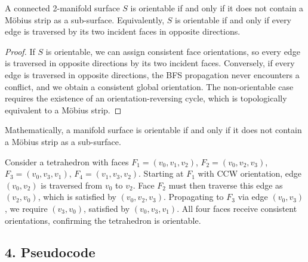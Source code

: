 \begin{theorem}\label{thm:orientability}
A connected 2-manifold surface $S$ is orientable if and only if it does not contain a M\"obius strip as a sub-surface. Equivalently, $S$ is orientable if and only if every edge is traversed by its two incident faces in opposite directions.
\end{theorem}

\begin{proof}
If $S$ is orientable, we can assign consistent face orientations, so every edge is traversed in opposite directions by its two incident faces. Conversely, if every edge is traversed in opposite directions, the BFS propagation never encounters a conflict, and we obtain a consistent global orientation. The non-orientable case requires the existence of an orientation-reversing cycle, which is topologically equivalent to a M\"obius strip.
\end{proof}

Mathematically, a manifold surface is orientable if and only if it does not contain a M\"obius strip as a sub-surface.

\begin{example}\label{ex:orient_mesh}
Consider a tetrahedron with faces $F_1 = (v_0,v_1,v_2)$, $F_2 = (v_0,v_2,v_3)$, $F_3 = (v_0,v_3,v_1)$, $F_4 = (v_1,v_3,v_2)$. Starting at $F_1$ with CCW orientation, edge $(v_0,v_2)$ is traversed from $v_0$ to $v_2$. Face $F_2$ must then traverse this edge as $(v_2,v_0)$, which is satisfied by $(v_0,v_2,v_3)$. Propagating to $F_3$ via edge $(v_0,v_3)$, we require $(v_3,v_0)$, satisfied by $(v_0,v_3,v_1)$. All four faces receive consistent orientations, confirming the tetrahedron is orientable.
\end{example}

\subsection{4. Pseudocode}

